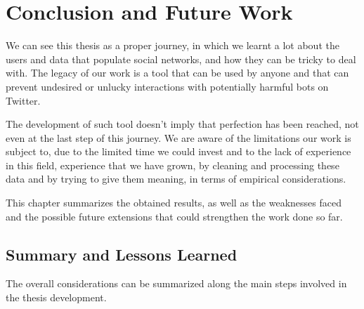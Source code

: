 \chapter{Conclusion and Future Work}
\label{capitolo8}
\thispagestyle{empty}

We can see this thesis as a proper journey, in which we learnt a lot about the users and data that populate social networks, and how they can be tricky to deal with.
The legacy of our work is a tool that can be used by anyone and that can prevent undesired or unlucky interactions with potentially harmful bots on Twitter.

The development of such tool doesn't imply that perfection has been reached, not even at the last step of this journey. We are aware of the limitations our work is subject to, due to the limited time we could invest and to the lack of experience in this field, experience that we have grown, by cleaning and processing these data and by trying to give them meaning, in terms of empirical considerations. 

This chapter summarizes the obtained results, as well as the weaknesses faced and the possible future extensions that could strengthen the work done so far.

\section{Summary and Lessons Learned}
The overall considerations can be summarized along the main steps involved in the thesis development.

